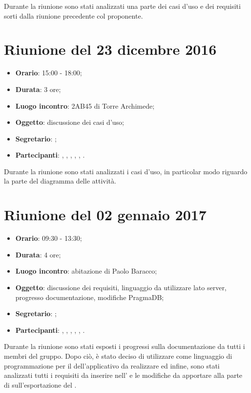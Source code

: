 Durante la riunione sono stati analizzati una parte dei casi d'uso e dei requisiti sorti dalla riunione precedente col proponente.


\section{Riunione del 23 dicembre 2016}

\begin{itemize}
	\item \textbf{Orario}: 15:00 - 18:00;
	\item \textbf{Durata}: 3 ore;
	\item \textbf{Luogo incontro}: 2AB45 di Torre Archimede; 
	\item \textbf{Oggetto}: discussione dei casi d'uso;
	\item \textbf{Segretario}: \PB; 
	\item \textbf{Partecipanti}: \AZ, \GG, \LB, \LS, \MM, \PB.
\end{itemize}

Durante la riunione sono stati analizzati i casi d'uso, in particolar modo riguardo la parte del diagramma delle attività.

\section{Riunione del 02 gennaio 2017}

\begin{itemize}
	\item \textbf{Orario}: 09:30 - 13:30;
	\item \textbf{Durata}: 4 ore;
	\item \textbf{Luogo incontro}: abitazione di Paolo Baracco; 
	\item \textbf{Oggetto}: discussione dei requisiti, linguaggio da utilizzare lato server, progresso documentazione, modifiche PragmaDB;
	\item \textbf{Segretario}: \PB; 
	\item \textbf{Partecipanti}: \AZ, \GG, \LB, \LS, \MM, \PB.
\end{itemize}

Durante la riunione sono stati esposti i progressi sulla documentazione da tutti i membri del gruppo. Dopo ciò, è stato deciso di utilizzare  come linguaggio di programmazione per il  dell'applicativo da realizzare ed infine, sono stati analizzati tutti i requisiti da inserire nell'\AdR{} e le modifiche da apportare alla parte  di  sull'esportazione del \Glossario.

